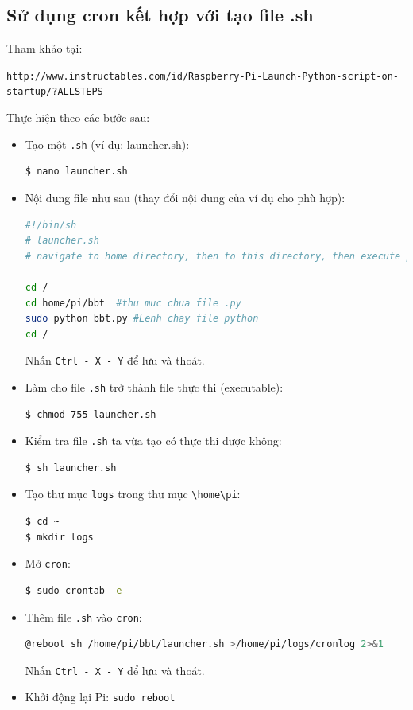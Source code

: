 \subsection{Sử dụng cron kết hợp với tạo file .sh}
Tham khảo tại:

\begin{footnotesize}
\verb|http://www.instructables.com/id/Raspberry-Pi-Launch-Python-script-on-startup/?ALLSTEPS|
\end{footnotesize}

Thực hiện theo các bước sau:
\begin{itemize}
\item Tạo một \verb|.sh| (ví dụ: launcher.sh):
\begin{lstlisting}[language=bash]
$ nano launcher.sh
\end{lstlisting}
\item Nội dung file như sau (thay đổi nội dung của ví dụ cho phù hợp):
\begin{lstlisting}[language=bash]
#!/bin/sh
# launcher.sh
# navigate to home directory, then to this directory, then execute python script, then back home

cd /
cd home/pi/bbt  #thu muc chua file .py
sudo python bbt.py #Lenh chay file python
cd /
\end{lstlisting}
Nhấn \verb|Ctrl - X - Y| để lưu và thoát.
\item Làm cho file \verb|.sh| trở thành file thực thi (executable): 
\begin{lstlisting}[language=bash]
$ chmod 755 launcher.sh
\end{lstlisting}
\item Kiểm tra file \verb|.sh| ta vừa tạo có thực thi được không:
\begin{lstlisting}[language=bash]
$ sh launcher.sh
\end{lstlisting}
\item Tạo thư mục \verb|logs| trong thư mục \verb|\home\pi|:
\begin{lstlisting}[language=bash]
$ cd ~
$ mkdir logs
\end{lstlisting}
\item Mở \verb|cron|:
\begin{lstlisting}[language=bash]
$ sudo crontab -e
\end{lstlisting}
\item Thêm file \verb|.sh| vào \verb|cron|:
\begin{lstlisting}[language=bash]
@reboot sh /home/pi/bbt/launcher.sh >/home/pi/logs/cronlog 2>&1
\end{lstlisting}
Nhấn \verb|Ctrl - X - Y| để lưu và thoát.
\item Khởi động lại Pi: \verb|sudo reboot|
\end{itemize}